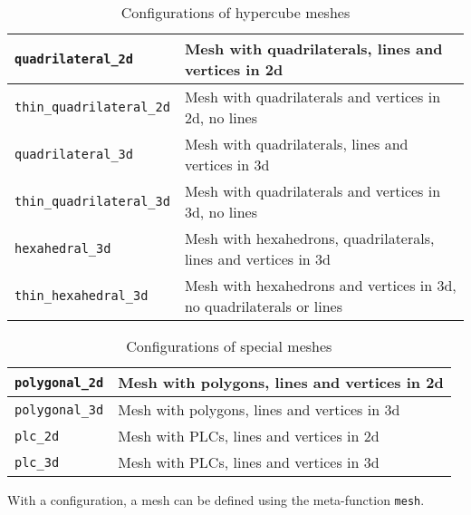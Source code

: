 \begin{table}[tb]
  \begin{center}
    \begin{tabular}{|l|l|}
      \hline
      \lstinline|quadrilateral_2d|        &  Mesh with quadrilaterals, lines and vertices in 2d  \\
      \hline
      \lstinline|thin_quadrilateral_2d|   &  Mesh with quadrilaterals and vertices in 2d, no lines  \\
      \hline
      \lstinline|quadrilateral_3d|        &  Mesh with quadrilaterals, lines and vertices in 3d  \\
      \hline
      \lstinline|thin_quadrilateral_3d|   &  Mesh with quadrilaterals and vertices in 3d, no lines  \\
      \hline
      \lstinline|hexahedral_3d|           &  Mesh with hexahedrons, quadrilaterals, lines and vertices in 3d  \\
      \hline
      \lstinline|thin_hexahedral_3d|      &  Mesh with hexahedrons and vertices in 3d, no quadrilaterals or lines  \\
      \hline
    \end{tabular}
    \caption{Configurations of hypercube meshes}
    \label{tab:configs-hypercube}
  \end{center}
\end{table}


\begin{table}[tb]
  \begin{center}
    \begin{tabular}{|l|l|}
      \hline
      \lstinline|polygonal_2d|   &  Mesh with polygons, lines and vertices in 2d  \\
      \hline
      \lstinline|polygonal_3d|   &  Mesh with polygons, lines and vertices in 3d  \\
      \hline
      \lstinline|plc_2d|   &  Mesh with PLCs, lines and vertices in 2d  \\
      \hline
      \lstinline|plc_3d|   &  Mesh with PLCs, lines and vertices in 3d  \\
      \hline
    \end{tabular}
    \caption{Configurations of special meshes}
    \label{tab:configs-special}
  \end{center}
\end{table}

\pagebreak

With a configuration, a mesh can be defined using the meta-function \lstinline|mesh|.

